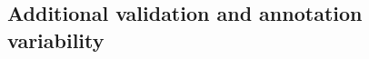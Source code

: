 \documentclass[pmlr,twocolumn,10pt]{jmlr} %
\begin{document}

\subsection{Additional validation and annotation variability}
\label{sec:additional_validation}
\end{document}
